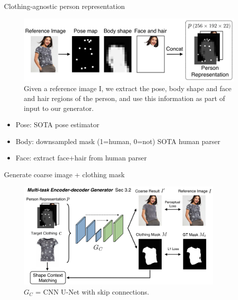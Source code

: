 \documentclass{beamer}
\begin{document}
\begin{frame}{Clothing-agnostic person representation}

\begin{figure}[h]
\includegraphics[width=\textwidth]{img/pr}
\caption{Given a reference image I, we extract the pose, body shape and face and hair regions of the person, and use this information as part of input to our generator.}
\end{figure}

\begin{itemize}
\item Pose: SOTA pose estimator
\item Body: downsampled mask (1=human, 0=not) SOTA human parser
\item Face: extract face+hair from human parser
\end{itemize}

\end{frame}
\begin{frame}{Generate coarse image + clothing mask}

\begin{figure}[h]
\includegraphics[width=0.9\textwidth]{img/ae}
\caption{$G_C$ = CNN U-Net with skip connections.}
\end{figure}

\end{frame}
\end{document}
